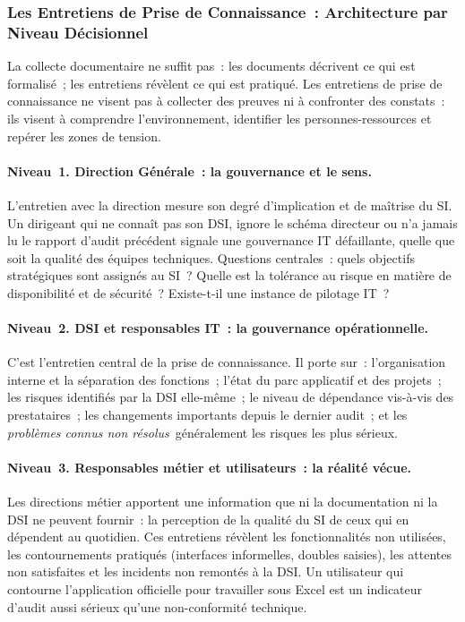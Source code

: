 \subsubsection{Les Entretiens de Prise de Connaissance~: Architecture par Niveau Décisionnel}

La collecte documentaire ne suffit pas~: les documents décrivent ce qui est formalisé~;
les entretiens révèlent ce qui est pratiqué. Les entretiens de prise de connaissance ne
visent pas à collecter des preuves ni à confronter des constats~: ils visent à comprendre
l'environnement, identifier les personnes-ressources et repérer les zones de tension.

\paragraph{Niveau~1. Direction Générale~: la gouvernance et le sens.}
L'entretien avec la direction mesure son degré d'implication et de maîtrise du SI.
Un dirigeant qui ne connaît pas son DSI, ignore le schéma directeur ou n'a jamais
lu le rapport d'audit précédent signale une gouvernance IT défaillante, quelle que soit
la qualité des équipes techniques. Questions centrales~: quels objectifs stratégiques sont
assignés au SI~? Quelle est la tolérance au risque en matière de disponibilité et de
sécurité~? Existe-t-il une instance de pilotage IT~?

\paragraph{Niveau~2. DSI et responsables IT~: la gouvernance opérationnelle.}
C'est l'entretien central de la prise de connaissance. Il porte sur~: l'organisation
interne et la séparation des fonctions~; l'état du parc applicatif et des projets~;
les risques identifiés par la DSI elle-même~; le niveau de dépendance vis-à-vis des
prestataires~; les changements importants depuis le dernier audit~; et les
\emph{problèmes connus non résolus}~généralement les risques les plus sérieux.

\paragraph{Niveau~3. Responsables métier et utilisateurs~: la réalité vécue.}
Les directions métier apportent une information que ni la documentation ni la DSI ne
peuvent fournir~: la perception de la qualité du SI de ceux qui en dépendent au
quotidien. Ces entretiens révèlent les fonctionnalités non utilisées, les contournements
pratiqués (interfaces informelles, doubles saisies), les attentes non satisfaites et
les incidents non remontés à la DSI. Un utilisateur qui contourne l'application officielle
pour travailler sous Excel est un indicateur d'audit aussi sérieux qu'une non-conformité
technique.

